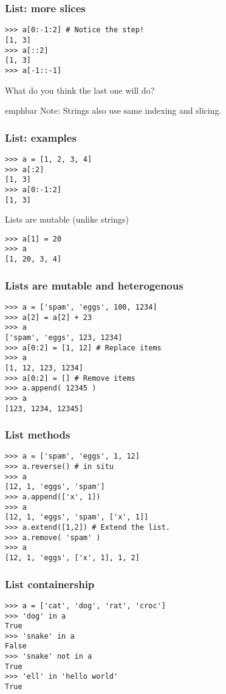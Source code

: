 \documentclass[14pt,compress]{beamer}
\newcommand{\emphbar}[1]
{\begin{beamercolorbox}[rounded=true]{emphbar} 
      {#1}
 \end{beamercolorbox}
}
\begin{document}
\begin{frame}[fragile]
  \frametitle{List: more slices}
\begin{lstlisting}
>>> a[0:-1:2] # Notice the step!
[1, 3]
>>> a[::2]
[1, 3]
>>> a[-1::-1]
\end{lstlisting}
What do you think the last one will do?
  \emphbar{Note: Strings also use same indexing and slicing.}
\end{frame}

\begin{frame}[fragile]
  \frametitle{List: examples}
\begin{lstlisting}
>>> a = [1, 2, 3, 4]
>>> a[:2]
[1, 3]
>>> a[0:-1:2]
[1, 3]
\end{lstlisting}
\pause
\alert{Lists are mutable (unlike strings)}
\begin{lstlisting}
>>> a[1] = 20
>>> a
[1, 20, 3, 4]
\end{lstlisting}
\end{frame}

\begin{frame}[fragile]
  \frametitle{Lists are mutable and heterogenous}
\begin{lstlisting}
>>> a = ['spam', 'eggs', 100, 1234]
>>> a[2] = a[2] + 23
>>> a
['spam', 'eggs', 123, 1234]
>>> a[0:2] = [1, 12] # Replace items
>>> a
[1, 12, 123, 1234]
>>> a[0:2] = [] # Remove items
>>> a.append( 12345 )
>>> a
[123, 1234, 12345]
\end{lstlisting}
\end{frame}

\begin{frame}[fragile]
  \frametitle{List methods}
\begin{lstlisting}
>>> a = ['spam', 'eggs', 1, 12]
>>> a.reverse() # in situ
>>> a
[12, 1, 'eggs', 'spam']
>>> a.append(['x', 1]) 
>>> a
[12, 1, 'eggs', 'spam', ['x', 1]]
>>> a.extend([1,2]) # Extend the list.
>>> a.remove( 'spam' )
>>> a
[12, 1, 'eggs', ['x', 1], 1, 2]
\end{lstlisting}
\end{frame}

\begin{frame}[fragile]
  \frametitle{List containership}
  \begin{lstlisting}
>>> a = ['cat', 'dog', 'rat', 'croc']
>>> 'dog' in a
True
>>> 'snake' in a
False
>>> 'snake' not in a
True
>>> 'ell' in 'hello world'
True
  \end{lstlisting}
\end{frame}
\end{document}
